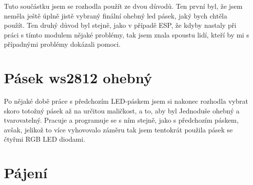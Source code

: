 Tuto součástku jsem se rozhodla použít ze dvou důvodů. Ten první byl, že jsem neměla ještě úplně jistě vybraný finální ohebný led pásek, jaký bych chtěla použít. Ten druhý důvod byl stejně, jako v případě ESP, že kdyby nastaly při práci s tímto modulem nějaké problémy, tak jsem znala spoustu lidí, kteří by mi s případnými problémy dokázali pomoci. 


\section{Pásek ws2812 ohebný}
Po nějaké době práce s předchozím LED-páskem jsem si nakonec rozhodla vybrat skoro totožný pásek až na určitou maličkost, a to, aby byl Jednoduše ohebný a tvarovatelný. Pracuje a programuje se s ním stejně, jako s předchozím páskem, avšak, jelikož to více vyhovovalo záměru tak jsem tentokrát použila pásek se čtyřmi RGB LED diodami. 

\section{Pájení}



